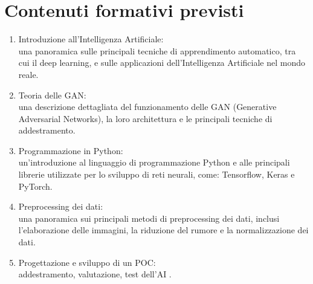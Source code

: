 \newpage
\section*{Contenuti formativi previsti}
\begin{enumerate}
    \item Introduzione all'Intelligenza Artificiale: \\
          una panoramica sulle principali tecniche di apprendimento automatico, tra cui il deep learning, e sulle applicazioni dell'Intelligenza Artificiale nel mondo reale.
    \item Teoria delle GAN: \\
          una descrizione dettagliata del funzionamento delle GAN (Generative Adversarial Networks), la loro architettura e le principali tecniche di addestramento.
    \item Programmazione in Python: \\
          un'introduzione al linguaggio di programmazione Python e alle principali librerie utilizzate per lo sviluppo di reti neurali, come: Tensorflow, Keras e PyTorch.
    \item Preprocessing dei dati: \\
          una panoramica sui principali metodi di preprocessing dei dati, inclusi l'elaborazione delle immagini, la riduzione del rumore e la normalizzazione dei dati.
    \item Progettazione e sviluppo di un POC: \\
          addestramento, valutazione, test dell'AI .
\end{enumerate}
\newpage